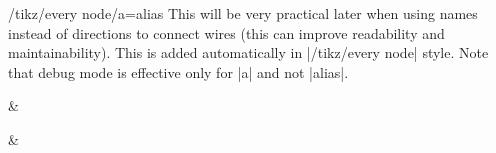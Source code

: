 \documentclass[a4paper]{ltxdoc}
\begin{document}
{\begin{stylekey}{/tikz/every node/a=alias}
  This will be very practical later when using names instead of directions to connect wires (this can improve readability and maintainability). This is added automatically in |/tikz/every node| style. Note that debug mode is effective only for |a| and not |alias|.
\begin{codeexample}[width=3cm]
  \begin{ZX}
    \zxX[a=A]{} & \zxZ[a=B]{\beta}
    \ar[from=A,to=B]
  \end{ZX}
  {\def\zxDebugMode{} %
    \begin{ZX}
      \zxX[a=A]{} & \zxZ[a=B]{\beta}
      \ar[from=A,to=B]
    \end{ZX}
  }
\end{codeexample}
\end{stylekey}

}
\end{document}
